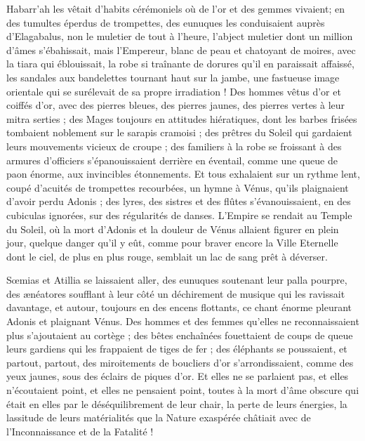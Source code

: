 \documentclass[a4paper, 11pt, oneside, polutonikogreek, french]{article}
\begin{document}
Habarr'ah les vêtait d'habits cérémoniels où de l'or et des gemmes vivaient; en des tumultes éperdus de trompettes, des eunuques les conduisaient auprès d'Elagabalus, non le muletier de tout à l'heure, l'abject muletier dont un million d'âmes s'ébahissait, mais l'Empereur, blanc de peau et chatoyant de moires, avec la tiara qui éblouissait, la robe si traînante de dorures qu'il en paraissait affaissé, les sandales aux bandelettes tournant haut sur la jambe, une fastueuse image orientale qui se surélevait de sa propre irradiation ! Des hommes vêtus d'or et coiffés d'or, avec des pierres bleues, des pierres jaunes, des pierres vertes à leur mitra serties ; des Mages toujours en attitudes hiératiques, dont les barbes frisées tombaient noblement sur le sarapis cramoisi ; des prêtres du Soleil qui gardaient leurs mouvements vicieux de croupe ; des familiers à la robe se froissant à des armures d'officiers s'épanouissaient derrière en éventail, comme une queue de paon énorme, aux invincibles étonnements. Et tous exhalaient sur un rythme lent, coupé d'acuités de trompettes recourbées, un hymne à Vénus, qu'ils plaignaient d'avoir perdu Adonis ; des lyres, des sistres et des flûtes s'évanouissaient, en des cubiculas ignorées, sur des régularités de danses. L'Empire se rendait au Temple du Soleil, où la mort d'Adonis et la douleur de Vénus allaient figurer en plein jour, quelque danger qu'il y eût, comme pour braver encore la Ville Eternelle dont le ciel, de plus en plus rouge, semblait un lac de sang prêt à déverser.

Sœmias et Atillia se laissaient aller, des eunuques soutenant leur palla pourpre, des ænéatores soufflant à leur côté un déchirement de musique qui les ravissait davantage, et autour, toujours en des encens flottants, ce chant énorme pleurant Adonis et plaignant Vénus. Des hommes et des femmes qu'elles ne reconnaissaient plus s'ajoutaient au cortège ; des bêtes enchaînées fouettaient de coups de queue leurs gardiens qui les frappaient de tiges de fer ; des éléphants se poussaient, et partout, partout, des miroitements de boucliers d'or s'arrondissaient, comme des yeux jaunes, sous des éclairs de piques d'or. Et elles ne se parlaient pas, et elles n'écoutaient point, et elles ne pensaient point, toutes à la mort d'âme obscure qui était en elles par le déséquilibrement de leur chair, la perte de leurs énergies, la lassitude de leurs matérialités que la Nature exaspérée châtiait avec de l’Inconnaissance et de la Fatalité !
\end{document}
